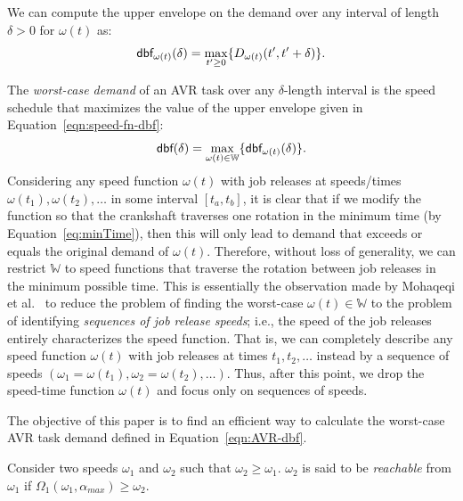 \noindent We can compute the upper envelope on the demand over any interval of length $\delta > 0$ for $\omega(t)$ as:
\begin{equation}\label{eqn:speed-fn-dbf}
    \mbox{\sf dbf}_{\omega(t)}(\delta) = \max_{t' \geq 0} \{D_{\omega(t)}(t', t' + \delta)\}.
\end{equation}

\noindent The \emph{worst-case demand} of an AVR task over any $\delta$-length interval is the speed schedule that maximizes the value of the upper envelope given in Equation~\ref{eqn:speed-fn-dbf}:
\begin{equation}\label{eqn:AVR-dbf}
    \mbox{\sf dbf}(\delta) = \max_{\omega(t) \in \mathbb{W}} \{\mbox{\sf dbf}_{\omega(t)}(\delta)\}.
\end{equation}
Considering any speed function $\omega(t)$ with job releases at speeds/times $\omega(t_1),\omega(t_2),\ldots$ in some interval $[t_a, t_b]$, it is clear that if we modify the function so that the crankshaft traverses one rotation in the minimum time (by Equation~\ref{eq:minTime}), then this will only lead to demand that exceeds or equals the original demand of $\omega(t)$.
Therefore, without loss of generality, we can restrict $\mathbb{W}$ to speed functions that traverse the rotation between job releases in the minimum possible time.
 This is essentially the observation made by Mohaqeqi et al.~\cite{mohaqeqi_refinement_2017} to reduce the problem of finding the worst-case $\omega(t) \in \mathbb{W}$ to the problem of identifying \emph{sequences of job release speeds}; i.e., the speed of the job releases entirely characterizes the speed function.
That is, we can completely describe any speed function $\omega(t)$ with job releases at times $t_1, t_2, \ldots$ instead by a sequence of speeds $(\omega_1 = \omega(t_1), \omega_2 = \omega(t_2), \ldots)$.
 Thus, after this point, we drop the speed-time function $\omega(t)$ and focus only on sequences of speeds.

\noindent The objective of this paper is to find an efficient way to calculate the worst-case AVR task demand defined in Equation~\ref{eqn:AVR-dbf}.

\begin{definition}\label{def:reachable-speeds}
Consider two speeds $\omega_1$ and $\omega_2$ such that $\omega_2\geq\omega_1$.
$\omega_2$ is said to be \emph{reachable} from $\omega_1$ if $\Omega_1(\omega_1,\alpha_{max})\geq \omega_2$.
\end{definition}

